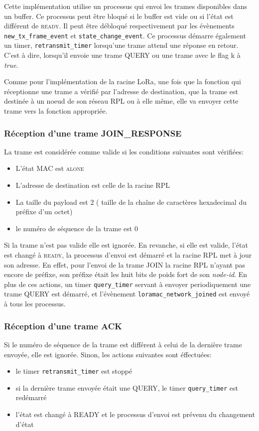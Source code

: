    Cette implémentation utilise un processus qui envoi les trames disponibles dans un buffer. 
    Ce processus peut être bloqué si le buffer est vide ou si l'état est différent de \textsc{ready}. Il peut être débloqué respectivement par les évènements
    \texttt{new\_tx\_frame\_event} et \texttt{state\_change\_event}. Ce processus démarre également un timer, \texttt{retransmit\_timer} lorsqu'une trame attend une réponse en retour. C'est à dire, lorsqu'il envoie une trame QUERY ou une trame avec le flag k à \textit{true}.
    
    Comme pour l'implémentation de la racine LoRa, une fois que la fonction qui réceptionne une trame a vérifié par l'adresse de destination, que la trame est destinée à un noeud de son réseau RPL ou à elle même, elle va envoyer cette trame vers la fonction appropriée.

    \subsubsection*{Réception d'une trame JOIN\_RESPONSE}
        La trame est considérée comme valide si les conditions suivantes sont vérifiées:
        \begin{itemize}
            \item L'état MAC est \textsc{alone}
            \item L'adresse de destination est celle de la racine RPL
            \item La taille du payload est 2 ( taille de la chaîne de caractères hexadecimal du préfixe d'un octet)
            \item le numéro de séquence de la trame est 0
        \end{itemize}

        Si la trame n'est pas valide elle est ignorée. En revanche, si elle est valide, l'état est changé à \textsc{ready}, la processus d'envoi est démarré et la racine RPL met à jour son adresse. En effet, pour l'envoi de la trame JOIN la racine RPL n'ayant pas encore de préfixe, son préfixe était les huit bits de poids fort de son \textit{node-id}. En plus de ces actions, un timer
        \texttt{query\_timer} servant à envoyer periodiquement une trame QUERY est démarré, et l'évènement \texttt{loramac\_network\_joined} est envoyé à tous les processus.


    \subsubsection*{Réception d'une trame ACK}
        Si le numéro de séquence de la trame est différent à celui de la dernière trame envoyée, elle est ignorée. Sinon, les actions suivantes sont éffectuées:
        \begin{itemize}
            \item le timer \texttt{retransmit\_timer} est stoppé
            \item si la dernière trame envoyée était une QUERY, le timer \texttt{query\_timer} est redémarré
            \item l'état est changé à READY et le processus d'envoi est prévenu du changement d'état
        \end{itemize}

